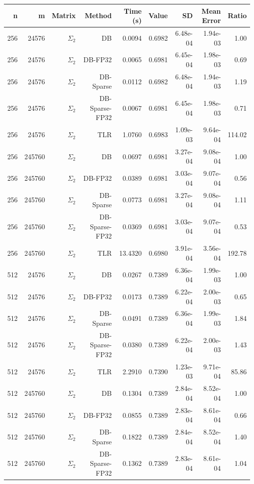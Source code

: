 \begin{tabular}{|r|r|r|r|r|r|r|r|r|}
  \hline
  \textbf{n} & \textbf{m} & \textbf{Matrix} & \textbf{Method} & \textbf{Time (s)} & \textbf{Value} & \textbf{SD} & \textbf{Mean Error} & \textbf{Ratio} \\
  \hline
  256 & 24576 & $\Sigma_2$ & DB & 0.0094 & 0.6982 & 6.48e-04 & 1.94e-03 & 1.00 \\
  256 & 24576 & $\Sigma_2$ & DB-FP32 & 0.0065 & 0.6981 & 6.45e-04 & 1.98e-03 & 0.69 \\
  256 & 24576 & $\Sigma_2$ & DB-Sparse & 0.0112 & 0.6982 & 6.48e-04 & 1.94e-03 & 1.19 \\
  256 & 24576 & $\Sigma_2$ & DB-Sparse-FP32 & 0.0067 & 0.6981 & 6.45e-04 & 1.98e-03 & 0.71 \\
  256 & 24576 & $\Sigma_2$ & TLR & 1.0760 & 0.6983 & 1.09e-03 & 9.64e-04 & 114.02 \\
  256 & 245760 & $\Sigma_2$ & DB & 0.0697 & 0.6981 & 3.27e-04 & 9.08e-04 & 1.00 \\
  256 & 245760 & $\Sigma_2$ & DB-FP32 & 0.0389 & 0.6981 & 3.03e-04 & 9.07e-04 & 0.56 \\
  256 & 245760 & $\Sigma_2$ & DB-Sparse & 0.0773 & 0.6981 & 3.27e-04 & 9.08e-04 & 1.11 \\
  256 & 245760 & $\Sigma_2$ & DB-Sparse-FP32 & 0.0369 & 0.6981 & 3.03e-04 & 9.07e-04 & 0.53 \\
  256 & 245760 & $\Sigma_2$ & TLR & 13.4320 & 0.6980 & 3.91e-04 & 3.56e-04 & 192.78 \\
  512 & 24576 & $\Sigma_2$ & DB & 0.0267 & 0.7389 & 6.36e-04 & 1.99e-03 & 1.00 \\
  512 & 24576 & $\Sigma_2$ & DB-FP32 & 0.0173 & 0.7389 & 6.22e-04 & 2.00e-03 & 0.65 \\
  512 & 24576 & $\Sigma_2$ & DB-Sparse & 0.0491 & 0.7389 & 6.36e-04 & 1.99e-03 & 1.84 \\
  512 & 24576 & $\Sigma_2$ & DB-Sparse-FP32 & 0.0380 & 0.7389 & 6.22e-04 & 2.00e-03 & 1.43 \\
  512 & 24576 & $\Sigma_2$ & TLR & 2.2910 & 0.7390 & 1.23e-03 & 9.71e-04 & 85.86 \\
  512 & 245760 & $\Sigma_2$ & DB & 0.1304 & 0.7389 & 2.84e-04 & 8.52e-04 & 1.00 \\
  512 & 245760 & $\Sigma_2$ & DB-FP32 & 0.0855 & 0.7389 & 2.83e-04 & 8.61e-04 & 0.66 \\
  512 & 245760 & $\Sigma_2$ & DB-Sparse & 0.1822 & 0.7389 & 2.84e-04 & 8.52e-04 & 1.40 \\
  512 & 245760 & $\Sigma_2$ & DB-Sparse-FP32 & 0.1362 & 0.7389 & 2.83e-04 & 8.61e-04 & 1.04 \\

\end{tabular}
